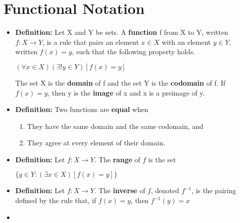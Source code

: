 \documentclass{report}
\begin{document}
	\section{Functional Notation}
		\begin{itemize}\addtolength{\leftskip}{2em}
			\item \textbf{Definition:} Let X and Y be sets. A \textbf{function} f from X to Y, written $f:X\rightarrow Y$, is a rule that pairs an element $x\in X$ with an element $y\in Y$, written $f(x)=y$, such that the following property holds.
			\begin{center}
			$(\forall x\in X)(\exists !y\in Y)[f(x)=y]$
			\end{center}
			\subsubitem The set X is the \textbf{domain} of f and the set Y is the \textbf{codomain} of f. If $f(x)=y$, then y is the \textbf{image} of x and x is a preimage of y.
			\item \textbf{Definition:} Two functions are \textbf{equal} when
			\begin{enumerate}\addtolength{\leftskip}{4em}
				\item They have the same domain and the same codomain, and
				\item They agree at every element of their domain.
			\end{enumerate}
			\item \textbf{Definition:} Let $f:X\rightarrow Y$. The \textbf{range} of $f$ is the set
			\begin{center}
			$\{ y\in Y: (\exists x\in X)[f(x)=y] \}$
			\end{center}
			\item \textbf{Definition:} Let $f:X\rightarrow Y$. The \textbf{inverse} of $f$, denoted $f^{-1}$, is the pairing defined by the rule that, if $f(x)=y$, then $f^{-1}(y)=x$
			\item 
		\end{itemize}
\end{document}
